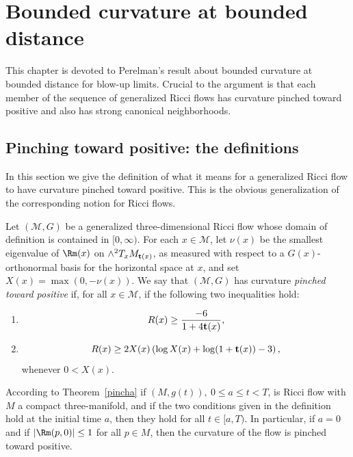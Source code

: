 \chapter{Bounded curvature at bounded distance}
\label{chap:bounded-curvature-bounded-distance}
This chapter is
devoted to Perelman's result about bounded curvature at bounded
distance for blow-up limits. Crucial to the argument is that each
member of the sequence of generalized Ricci flows has curvature
pinched toward positive and also has strong canonical neighborhoods.


\section{Pinching toward positive: the definitions}\label{10.1}

In this section we give the definition of what it means for a
generalized Ricci flow to have curvature pinched toward
positive. This is the
obvious generalization of the corresponding notion for Ricci flows.

\begin{definition}
\label{def:curvature-pinched-toward-positive}
\label{pinchdef}
Let $({\mathcal M},G)$ be a generalized three-dimensional Ricci flow
whose domain of definition is contained in $[0,\infty)$. For each
$x\in {\mathcal M}$, let $\nu(x)$ be the smallest eigenvalue of
$\Rm(x)$ on $\wedge^2T_xM_{{\bf t}(x)}$, as measured with
respect to a $G(x)$-orthonormal basis for the horizontal space at
$x$, and set $X(x)=\max(0,-\nu(x))$. We say that $({\mathcal
M},G)$ has curvature {\em pinched toward positive} if, for all $x\in
{\mathcal M}$, if the following two inequalities hold:
\begin{enumerate}
\item[(1)] $$R(x)\ge \frac{-6}{1+4{\bf t}(x)},$$
\item[(2)] $$R(x)\geq 2X(x)\left(\log X(x)+\log
(1+{\bf t}(x))-3\right),
$$ whenever
$0<X(x)$.
\end{enumerate}
\end{definition}

According to Theorem~\ref{pincha} if $(M,g(t)),\ 0\le a\le t<T$, is
Ricci flow with $M$  a compact three-manifold, and if the two
conditions given in the definition hold at the initial time $a$,
then they hold for all $t\in [a,T)$. In particular, if $a=0$ and if
$|\Rm(p,0)|\le 1$ for all $p\in M$, then the curvature of the
flow is pinched toward positive.

